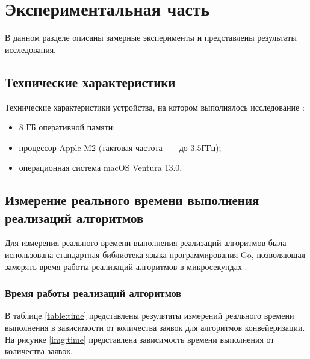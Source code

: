 \chapter{Экспериментальная часть}

В данном разделе описаны замерные эксперименты и представлены результаты исследования.

\section{Технические характеристики}
Технические характеристики устройства, на котором выполнялось исследование \cite{bib:5}:
\begin{itemize}
	\item 8 ГБ оперативной памяти;
	\item процессор Apple M2 (тактовая частота~---~до $3.5$ГГц);
    \item операционная система macOS Ventura 13.0.
\end{itemize}

\section{Измерение реального времени выполнения реализаций алгоритмов}

Для измерения реального времени выполнения реализаций алгоритмов была использована стандартная библиотека языка программирования Go, позволяющая замерять время работы реализаций алгоритмов в микросекундах \cite{bib:4}.

\subsection{Время работы реализаций алгоритмов}
В таблице \ref{table:time} представлены результаты измерений реального времени выполнения в зависимости от количества заявок для алгоритмов конвейеризации. На рисунке \ref{img:time} представлена зависимость времени выполнения от количества заявок.

\newpage

